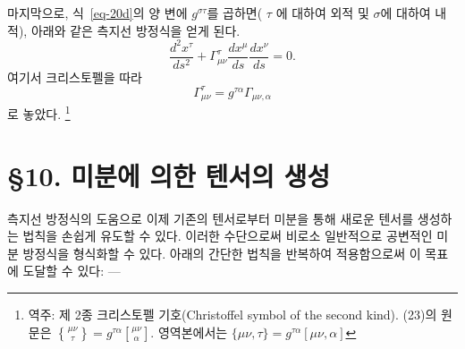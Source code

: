 마지막으로, 식~\eqref{eq-20d}의 양 변에 $g^{\sigma\tau}$를 곱하면(\Index{} $\tau$ 에 대하여 외적 및 \Index{} $\sigma$에 대하여 내적), 아래와 같은 측지선 방정식을 얻게 된다.
\begin{equation} \label{eq-22}
	\dfrac{d^2 x^\tau}{ds^2}+\Gamma_{\mu\nu}^\tau \dfrac{dx^\mu}{ds} \dfrac{dx^\nu}{ds}=0.
\end{equation}
여기서 크리스토펠을 따라
\begin{equation} \label{eq-23}
	\Gamma_{\mu\nu}^\tau = g^{\tau\alpha}\Gamma_{\mu\nu,\alpha}
\end{equation}
로 놓았다. \footnote{역주: 제 2종 크리스토펠 기호(Christoffel symbol of the second kind). (23)의 원문은 $\genfrac\{\}{0pt}{1}{\mu\nu}{\tau}=g^{\tau\alpha}\genfrac[]{0pt}{1}{\mu\nu}{\alpha}$. 영역본에서는 $\{\mu\nu,\tau\}=g^{\tau\alpha}[\mu\nu,\alpha]$}

\section*{\S 10. 미분에 의한 텐서의 생성}

측지선 방정식의 도움으로 이제 기존의 텐서로부터 미분을 통해 새로운 텐서를 생성하는 법칙을 손쉽게 유도할 수 있다. 이러한 수단으로써 비로소 일반적으로 공변적인 미분 방정식을 형식화할 수 있다. 아래의 간단한 법칙을 반복하여 적용함으로써 이 목표에 도달할 수 있다: ---

